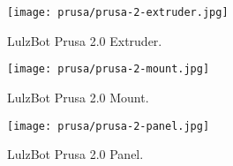 \begin{figure}[h!]
\texttt{[image: prusa/prusa-2-extruder.jpg]}
 \caption{LulzBot Prusa 2.0 Extruder.}
 \label{fig:prusa-2-extruder}
\end{figure}

\begin{figure}[h!]
\texttt{[image: prusa/prusa-2-mount.jpg]}
 \caption{LulzBot Prusa 2.0 Mount.}
 \label{fig:prusa-2-mount}
\end{figure}

\begin{figure}[h!]
\texttt{[image: prusa/prusa-2-panel.jpg]}
 \caption{LulzBot Prusa 2.0 Panel.}
 \label{fig:prusa-2-panel}
\end{figure}



